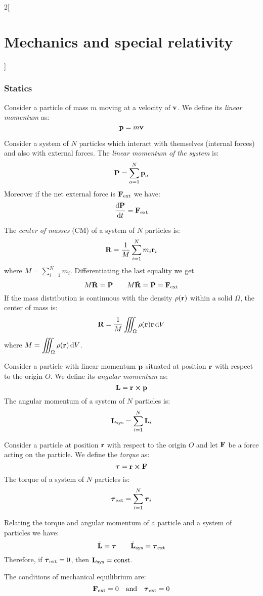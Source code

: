 \documentclass[../../../main.tex]{subfiles}
\begin{document}
\begin{multicols}{2}[\section{Mechanics and special relativity}]
  \subsubsection{Statics}
  \begin{definition}
    Consider a particle of mass $m$ moving at a velocity of $\boldsymbol{\mathrm{v}}$. We define its \emph{linear momentum} as:
    $$\boldsymbol{\mathrm{p}}=m\boldsymbol{\mathrm{v}}$$
  \end{definition}
  \begin{proposition}
    Consider a system of $N$ particles which interact with themselves (internal forces) and also with external forces. The \emph{linear momentum of the system} is: $$\boldsymbol{\mathrm{P}}=\sum_{a=1}^N\boldsymbol{\mathrm{p}}_a$$ Moreover if the net external force is $\boldsymbol{\mathrm{F}}_\text{ext}$ we have:
    $$\dv{\boldsymbol{\mathrm{P}}}{t}=\boldsymbol{\mathrm{F}}_\text{ext}$$
  \end{proposition}
  \begin{proposition}
    The \emph{center of masses} (CM) of a system of $N$ particles is: $$\boldsymbol{\mathrm{R}}=\frac{1}{M}\sum_{i=1}^Nm_i\boldsymbol{\mathrm{r}}_i$$ where $\displaystyle M=\sum_{i=1}^Nm_i$. Differentiating the last equality we get
    $$M\dot{\boldsymbol{\mathrm{R}}}=\boldsymbol{\mathrm{P}}\qquad M\ddot{\boldsymbol{\mathrm{R}}}=\dot{\boldsymbol{\mathrm{P}}}=\boldsymbol{\mathrm{F}}_\text{ext}$$
    If the mass distribution is continuous with the density $\rho(\boldsymbol{\mathrm{r}})$ within a solid $\Omega$, the center of mass is: $$\boldsymbol{\mathrm{R}}=\frac{1}{M}\iiint_\Omega\rho(\boldsymbol{\mathrm{r}})\boldsymbol{\mathrm{r}}\dd{V}$$ where $\displaystyle M=\iiint_\Omega\rho(\boldsymbol{\mathrm{r}})\dd{V}$.
  \end{proposition}
  \begin{proposition}
    Consider a particle with linear momentum $\boldsymbol{\mathrm{p}}$ situated at position $\boldsymbol{\mathrm{r}}$ with respect to the origin $O$. We define its \emph{angular momentum} as: $$\vf{L}=\vf{r}\crossprod\vf{p}$$ The angular momentum of a system of $N$ particles is: $$\boldsymbol{\mathrm{L}}_\text{sys}=\sum_{i=1}^N\boldsymbol{\mathrm{L}}_i$$
  \end{proposition}
  \begin{proposition}[Torque]
    Consider a particle at position $\boldsymbol{\mathrm{r}}$ with respect to the origin $O$ and let $\boldsymbol{\mathrm{F}}$ be a force acting on the particle. We define the \emph{torque} as: $$\vf{\tau}=\vf{r}\crossprod\vf{F}$$ The torque of a system of $N$ particles is: $$\boldsymbol{\mathrm{\tau}}_\text{ext}=\sum_{i=1}^N\boldsymbol{\mathrm{\tau}}_i$$
  \end{proposition}
  \begin{proposition}
    Relating the torque and angular momentum of a particle and a system of particles we have:
    $$\dot{\boldsymbol{\mathrm{L}}}=\boldsymbol{\mathrm{\tau}}\qquad\dot{\boldsymbol{\mathrm{L}}}_\text{sys}=\boldsymbol{\mathrm{\tau}}_\text{ext}$$ Therefore, if $\boldsymbol{\mathrm{\tau}}_\text{ext}=0$, then $\boldsymbol{\mathrm{L}}_\text{sys}=\text{const}.$
  \end{proposition}
  \begin{definition}
    The conditions of mechanical equilibrium are: $$\boldsymbol{\mathrm{F}}_\text{ext}=0\quad\text{and}\quad\boldsymbol{\mathrm{\tau}}_\text{ext}=0$$
  \end{definition}

\end{multicols}
\end{document}
